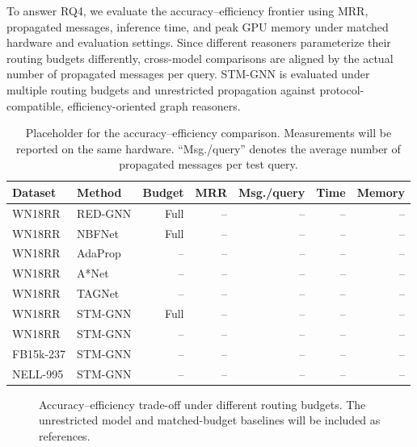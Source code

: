 \documentclass[a4paper,fleqn]{cas-sc}
\begin{document}
To answer RQ4, we evaluate the accuracy--efficiency frontier using MRR,
propagated messages, inference time, and peak GPU memory under matched hardware
and evaluation settings. Since different reasoners parameterize their routing
budgets differently, cross-model comparisons are aligned by the actual number
of propagated messages per query. STM-GNN is evaluated under multiple routing
budgets and unrestricted propagation against protocol-compatible,
efficiency-oriented graph reasoners.

\begin{table}[t]
\caption{Placeholder for the accuracy--efficiency comparison. Measurements will
be reported on the same hardware. ``Msg./query'' denotes the average number of
propagated messages per test query.}
\label{tab:efficiency}
\centering
\scriptsize
\setlength{\tabcolsep}{2.5pt}
\begin{tabular}{llrrrrr}
\toprule
Dataset & Method & Budget & MRR & Msg./query & Time & Memory \\
\midrule
WN18RR & RED-GNN & Full & -- & -- & -- & -- \\
WN18RR & NBFNet & Full & -- & -- & -- & -- \\
WN18RR & AdaProp & -- & -- & -- & -- & -- \\
WN18RR & A*Net & -- & -- & -- & -- & -- \\
WN18RR & TAGNet & -- & -- & -- & -- & -- \\
WN18RR & STM-GNN & Full & -- & -- & -- & -- \\
WN18RR & STM-GNN & -- & -- & -- & -- & -- \\
FB15k-237 & STM-GNN & -- & -- & -- & -- & -- \\
NELL-995 & STM-GNN & -- & -- & -- & -- & -- \\
\bottomrule
\end{tabular}
\end{table}

\begin{figure}[pos=htbp]
\centering
{}
\caption{Accuracy--efficiency trade-off under different routing budgets. The
unrestricted model and matched-budget baselines will be included as references.}
\label{fig:routing_budget}
\end{figure}
\FloatBarrier
\end{document}
